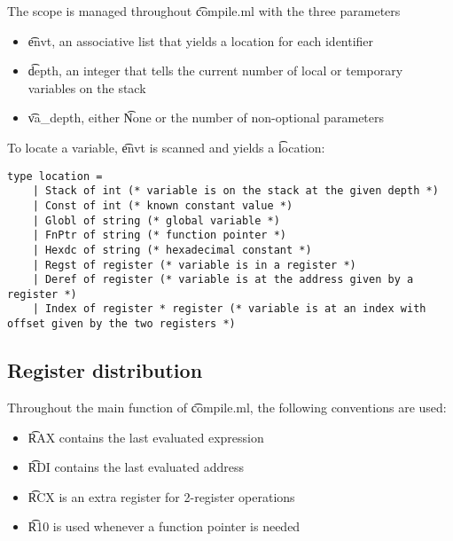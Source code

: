 The scope is managed throughout \t{compile.ml} with the three parameters
\begin{itemize}
    \item \t{envt}, an associative list that yields a location for each identifier
    \item \t{depth}, an integer that tells the current number of local or temporary variables on the stack
    \item \t{va\_depth}, either \t{None} or the number of non-optional parameters
\end{itemize}

To locate a variable, \t{envt} is scanned and yields a \t{location}:
\begin{verbatim}
type location =
    | Stack of int (* variable is on the stack at the given depth *)
    | Const of int (* known constant value *)
    | Globl of string (* global variable *)
    | FnPtr of string (* function pointer *)
    | Hexdc of string (* hexadecimal constant *)
    | Regst of register (* variable is in a register *)
    | Deref of register (* variable is at the address given by a register *)
    | Index of register * register (* variable is at an index with offset given by the two registers *)
\end{verbatim}

\subsection{Register distribution}

Throughout the main function of \t{compile.ml}, the following conventions are used:
\begin{itemize}
    \item \t{RAX} contains the last evaluated expression
    \item \t{RDI} contains the last evaluated address
    \item \t{RCX} is an extra register for 2-register operations
    \item \t{R10} is used whenever a function pointer is needed
\end{itemize}
